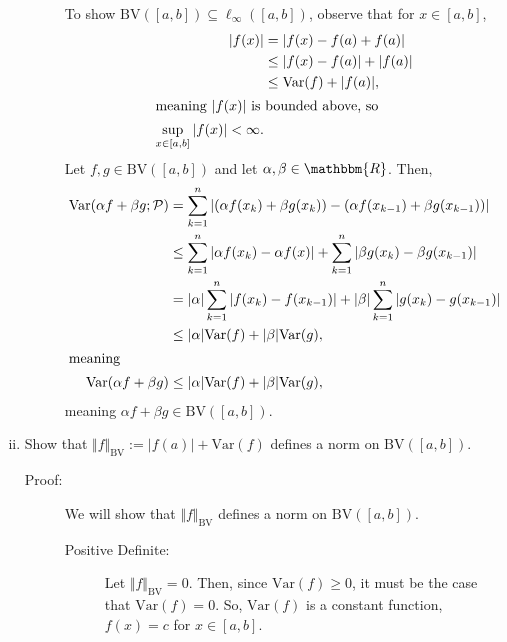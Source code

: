 \documentclass[10pt]{extarticle}
\newcommand{\R}{\mathbbm{R}}
\begin{document}
\begin{enumerate}[(i)]
\begin{description}
          To show $\text{BV}([a,b])\subseteq \ell_{\infty}([a,b])$, observe that for $x\in [a,b]$,
          \begin{align*}
            |f(x)| &= |f(x)-f(a) + f(a)|\\
                   &\leq |f(x)-f(a)| + |f(a)|\\
                   &\leq \text{Var}(f) + |f(a)|,\\
           \shortintertext{meaning $|f(x)|$ is bounded above, so}
           \sup_{x\in[a,b]}|f(x)| < \infty.
          \end{align*}
          Let $f,g\in \text{BV}([a,b])$ and let $\alpha,\beta \in \R$. Then,
          \begin{align*}
            \text{Var}(\alpha f + \beta g;\mathcal{P}) &= \sum_{k=1}^{n}|(\alpha f(x_k) + \beta g(x_k)) - (\alpha f(x_{k-1}) + \beta g(x_{k-1}))|\\
                                                       &\leq\sum_{k=1}^{n}|\alpha f(x_k)-\alpha f(x)| + \sum_{k=1}^{n}|\beta g(x_k)-\beta g(x_{k-1})|\\
                                                       &= |\alpha|\sum_{k=1}^{n}|f(x_k)-f(x_{k-1})| + |\beta|\sum_{k=1}^{n}|g(x_k) - g(x_{k-1})|\\
                                                       &\leq |\alpha|\text{Var}(f) + |\beta|\text{Var}(g),\\
                                                       \shortintertext{meaning}
            \text{Var}(\alpha f + \beta g) &\leq |\alpha|\text{Var}(f) + |\beta|\text{Var}(g),
          \end{align*}
          meaning $\alpha f + \beta g\in \text{BV}([a,b])$.
      \end{description}
    \item Show that $\Vert f\Vert_{\text{BV}} := |f(a)| + \text{Var}(f)$ defines a norm on $\text{BV}([a,b])$.
      \begin{description}
        \item[Proof:] We will show that $\Vert f \Vert_{\text{BV}}$ defines a norm on $\text{BV}([a,b])$.
          \begin{description}
            \item[Positive Definite:] Let $\Vert f \Vert_{\text{BV}} = 0$. Then, since $\text{Var}(f) \geq 0$, it must be the case that $\text{Var}(f) = 0$. So, $\text{Var}(f)$ is a constant function, $f(x) = c$ for $x\in [a,b]$.\\


\end{description}
\end{description}
\end{enumerate}
\end{document}
